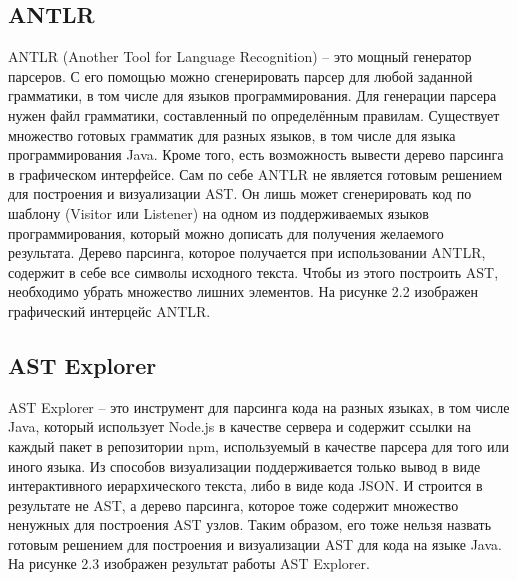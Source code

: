 \subsection{ANTLR} \label{ch2:subsec-title-abbr}
ANTLR (Another Tool for Language Recognition) – это мощный генератор парсеров. С его помощью можно сгенерировать парсер для любой заданной грамматики, в том числе для языков программирования. Для генерации парсера нужен файл грамматики, составленный по определённым правилам. Существует множество готовых грамматик для разных языков, в том числе для языка программирования Java. Кроме того, есть возможность вывести дерево парсинга в графическом интерфейсе.
Сам по себе ANTLR не является готовым решением для построения и визуализации AST. Он лишь может сгенерировать код по шаблону (Visitor или Listener) на одном из поддерживаемых языков программирования, который можно дописать для получения желаемого результата. Дерево парсинга, которое получается при использовании ANTLR, содержит в себе все символы исходного текста. Чтобы из этого построить AST, необходимо убрать множество лишних элементов. На рисунке 2.2 изображен графический интерцейс ANTLR.
\subsection{AST Explorer} \label{ch2:subsec-title-abbr}
AST Explorer – это инструмент для парсинга кода на разных языках, в том числе Java, который использует Node.js в качестве сервера и содержит ссылки на каждый пакет в репозитории npm, используемый в качестве парсера для того или иного языка.
Из способов визуализации поддерживается только вывод в виде интерактивного иерархического текста, либо в виде кода JSON. И строится в результате не AST, а дерево парсинга, которое тоже содержит множество ненужных для построения AST узлов.
Таким образом, его тоже нельзя назвать готовым решением для построения и визуализации AST для кода на языке Java. На рисунке 2.3 изображен результат работы AST Explorer.

